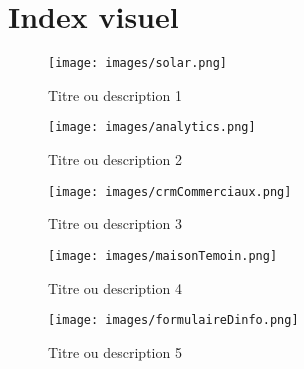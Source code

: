 \section*{Index visuel}

\begin{figure}[H]
    \centering
    \texttt{[image: images/solar.png]}
    \caption*{Titre ou description 1}

    \vspace{2em}

    \texttt{[image: images/analytics.png]}
    \caption*{Titre ou description 2}
\end{figure}

\newpage

\begin{figure}[H]
    \centering
    \texttt{[image: images/crmCommerciaux.png]}
    \caption*{Titre ou description 3}

    \vspace{2em}

    \texttt{[image: images/maisonTemoin.png]}
    \caption*{Titre ou description 4}
\end{figure}

\newpage

\begin{figure}[H]
    \centering
    \texttt{[image: images/formulaireDinfo.png]}
    \caption*{Titre ou description 5}

    \vspace{2em}

\end{figure}
